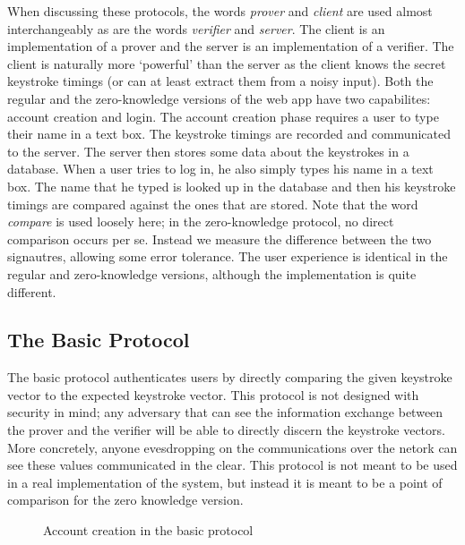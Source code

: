 \documentclass[11pt]{article}
\begin{document}
When discussing these protocols, the words \textit{prover} and \textit{client} are used almost interchangeably as are the words \textit{verifier} and \textit{server}. The client is an implementation of a prover and the server is an implementation of a verifier. The client is naturally more `powerful' than the server as the client knows the secret keystroke timings (or can at least extract them from a noisy input). Both the regular and the zero-knowledge versions of the web app have two capabilites: account creation and login. The account creation phase requires a user to type their name in a text box. The keystroke timings are recorded and communicated to the server. The server then stores some data about the keystrokes in a database. When a user tries to log in, he also simply types his name in a text box. The name that he typed is looked up in the database and then his keystroke timings are compared against the ones that are stored. Note that the word \emph{compare} is used loosely here; in the zero-knowledge protocol, no direct comparison occurs per se.  Instead we measure the difference between the two signautres, allowing some error tolerance.   The user experience is identical in the regular and zero-knowledge versions, although the implementation is quite different.

\subsection{The Basic Protocol}

The basic protocol authenticates users by directly comparing the given keystroke vector to the expected keystroke vector. This protocol is not designed with security in mind; any adversary that can see the information exchange between the prover and the verifier will be able to directly discern the keystroke vectors. More concretely, anyone evesdropping on the communications over the netork can see these values communicated in the clear. This protocol is not meant to be used in a real implementation of the system, but instead it is meant to be a point of comparison for the zero knowledge version.

\begin{figure}[h!]
\centering
{}
\caption{Account creation in the basic protocol}
\label{fig:basic_new}
\end{figure}
\end{document}
